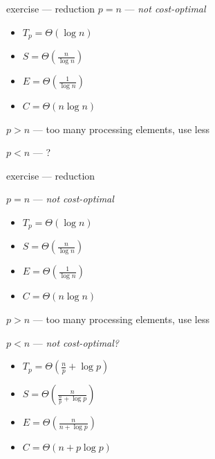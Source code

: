 \documentclass[10pt, t]{beamer}
\begin{document}
  \begin{frame}{exercise --- reduction}
    $p=n$ --- \emph{not cost-optimal}
    \begin{itemize}
      \item $T_p=\Theta(\log n)$
      \item $S=\Theta(\frac{n}{\log n})$
      \item $E=\Theta(\frac{1}{\log n})$
      \item $C=\Theta(n\log n)$
    \end{itemize}

    $p>n$ --- too many processing elements, use less

    $p<n$ --- ?
  \end{frame}

  \begin{frame}{exercise --- reduction}
    \addtocounter{framenumber}{-1}
    $p=n$ --- \emph{not cost-optimal}
    \begin{itemize}
      \item $T_p=\Theta(\log n)$
      \item $S=\Theta(\frac{n}{\log n})$
      \item $E=\Theta(\frac{1}{\log n})$
      \item $C=\Theta(n\log n)$
    \end{itemize}

    $p>n$ --- too many processing elements, use less

    $p<n$ --- \emph{not cost-optimal?}
    \begin{itemize}
      \item $T_p=\Theta(\frac{n}{p}+\log p)$
      \item $S=\Theta(\frac{n}{\frac{n}{p}+\log p})$
      \item $E=\Theta(\frac{n}{n+\log p})$
      \item $C=\Theta(n+p\log p)$
    \end{itemize}
  \end{frame}
\end{document}
